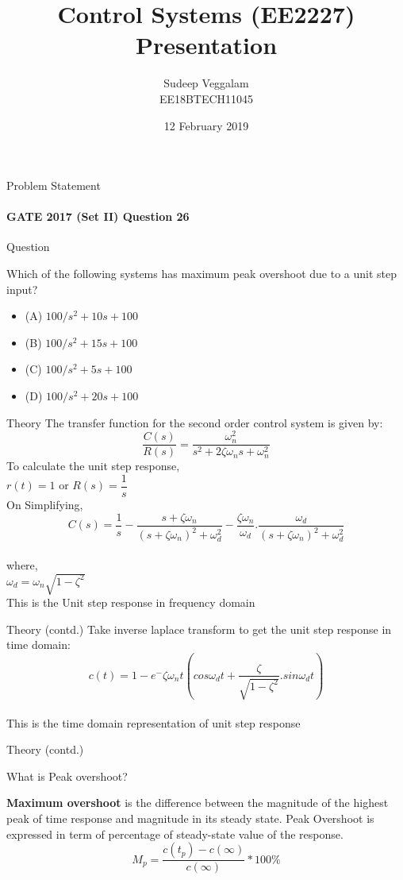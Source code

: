 \documentclass{beamer}
\title{Control Systems (EE2227) Presentation}
\author{Sudeep Veggalam \\ EE18BTECH11045}
\date{12 February 2019}
\begin{document}
\maketitle
\begin{frame}{Problem Statement}
\framesubtitle{GATE 2017 (Set II) Question 26}
    \begin{block}{Question}
        \item Which of the following systems has maximum peak overshoot due to a unit step input?
     \end{block}
\begin{itemize}
    \item(A) $100 / s^2 + 10s + 100$
    \item(B) $100 / s^2 + 15s + 100$
    \item(C) $100 / s^2 + 5s + 100$
    \item(D) $100 / s^2 + 20s + 100$
\end{itemize}
\end{frame}
\begin{frame}{Theory}
The transfer function for the second order control system is given by:
\begin{equation}
    \dfrac{C(s)}{R(s)}= \dfrac{\omega_n^2}{s^2 + 2\zeta\omega_ns + \omega_n^2}
\end{equation}
To calculate the unit step response,
\\$r(t) = 1$ or $R(s) = \dfrac{1}{s}$
\\On Simplifying, 
\begin{equation}
    C(s) = \dfrac{1}{s} - \dfrac{s + \zeta\omega_n}{(s + \zeta\omega_n)^2 + \omega_d^2} - \dfrac{\zeta\omega_n}{\omega_d}.\dfrac{\omega_d}{(s + \zeta\omega_n)^2 + \omega_d^2}  
\end{equation}
\\where,
\\$\omega_d=\omega_n\sqrt{1-\zeta^2}$
\\This is the Unit step response in frequency domain
\end{frame}
\begin{frame}{Theory (contd.)}
    Take inverse laplace transform to get the unit step response in time domain:
\begin{equation}
    c(t) = 1 - e^-\zeta\omega_nt(cos\omega_dt+\dfrac{\zeta}{\sqrt{1-\zeta^2}}.sin\omega_dt)
\end{equation}
\\This is the time domain representation of unit step response
\end{frame}
\begin{frame}{Theory (contd.)}
    \begin{block}{What is Peak overshoot?}
        \item \textbf{Maximum overshoot} is the difference between the magnitude of the highest peak of time response and magnitude in its steady state. Peak Overshoot is expressed in term of percentage of steady-state value of the response.
        \begin{equation}
            M_p = \dfrac{c(t_p) - c(\infty)}{c(\infty)} * 100 \%
        \end{equation}
     \end{block}
\end{frame}
\end{document}
